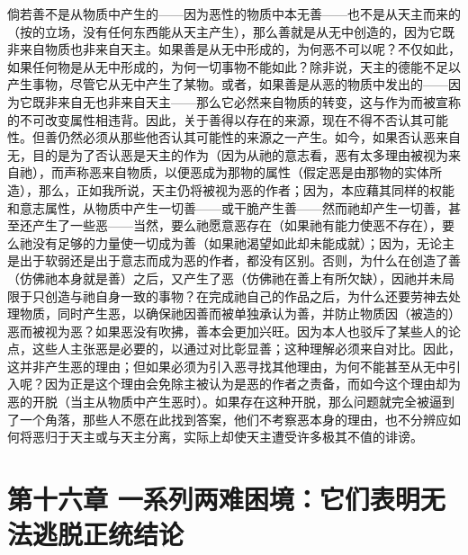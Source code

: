 倘若善不是从物质中产生的——因为恶性的物质中本无善——也不是从天主而来的（按的立场，没有任何东西能从天主产生），那么善就是从无中创造的，因为它既非来自物质也非来自天主。如果善是从无中形成的，为何恶不可以呢？不仅如此，如果任何物是从无中形成的，为何一切事物不能如此？除非说，天主的德能不足以产生事物，尽管它从无中产生了某物。或者，如果善是从恶的物质中发出的——因为它既非来自无也非来自天主——那么它必然来自物质的转变，这与作为而被宣称的不可改变属性相违背。因此，关于善得以存在的来源，现在不得不否认其可能性。但善仍然必须从那些他否认其可能性的来源之一产生。如今，如果否认恶来自无，目的是为了否认恶是天主的作为（因为从祂的意志看，恶有太多理由被视为来自祂），而声称恶来自物质，以便恶成为那物的属性（假定恶是由那物的实体所造），那么，正如我所说，天主仍将被视为恶的作者；因为，本应藉其同样的权能和意志属性，从物质中产生一切善——或干脆产生善——然而祂却产生一切善，甚至还产生了一些恶——当然，要么祂愿意恶存在（如果祂有能力使恶不存在），要么祂没有足够的力量使一切成为善（如果祂渴望如此却未能成就）；因为，无论主是出于软弱还是出于意志而成为恶的作者，都没有区别。否则，为什么在创造了善（仿佛祂本身就是善）之后，又产生了恶（仿佛祂在善上有所欠缺），因祂并未局限于只创造与祂自身一致的事物？在完成祂自己的作品之后，为什么还要劳神去处理物质，同时产生恶，以确保祂因善而被单独承认为善，并防止物质因（被造的）恶而被视为恶？如果恶没有吹拂，善本会更加兴旺。因为本人也驳斥了某些人的论点，这些人主张恶是必要的，以通过对比彰显善；这种理解必须来自对比。因此，这并非产生恶的理由；但如果必须为引入恶寻找其他理由，为何不能甚至从无中引入呢？因为正是这个理由会免除主被认为是恶的作者之责备，而如今这个理由却为恶的开脱（当主从物质中产生恶时）。如果存在这种开脱，那么问题就完全被逼到了一个角落，那些人不愿在此找到答案，他们不考察恶本身的理由，也不分辨应如何将恶归于天主或与天主分离，实际上却使天主遭受许多极其不值的诽谤。\par


\section{第十六章 一系列两难困境：它们表明无法逃脱正统结论}

